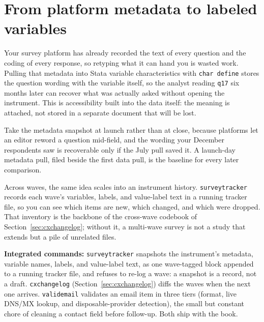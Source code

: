 \documentclass[
    a4paper,
    fontsize=10pt,
    twoside=true,
    numbers=noenddot,
]{kaobook}
\begin{document}
\section{From platform metadata to labeled variables}
Your survey platform has already recorded the text of every question and the coding of every response, so retyping what it can hand you is wasted work. Pulling that metadata into Stata variable characteristics with \texttt{char define} stores the question wording with the variable itself, so the analyst reading \texttt{q17} six months later can recover what was actually asked without opening the instrument. This is accessibility built into the data itself: the meaning is attached, not stored in a separate document that will be lost.

Take the metadata snapshot at launch rather than at close, because platforms let an editor reword a question mid-field, and the wording your December respondents saw is recoverable only if the July pull saved it. A launch-day metadata pull, filed beside the first data pull, is the baseline for every later comparison.

Across waves, the same idea scales into an instrument history. \texttt{surveytracker} records each wave's variables, labels, and value-label text in a running tracker file, so you can see which items are new, which changed, and which were dropped. That inventory is the backbone of the cross-wave codebook of Section~\ref{sec:cxchangelog}; without it, a multi-wave survey is not a study that extends but a pile of unrelated files.

\begin{kaobox}[frametitle=Package Integration: \texttt{surveytracker} and \texttt{validemail}]
\textbf{Integrated commands:} \texttt{surveytracker} snapshots the instrument's metadata, variable names, labels, and value-label text, as one wave-tagged block appended to a running tracker file, and refuses to re-log a wave: a snapshot is a record, not a draft. \texttt{cxchangelog} (Section~\ref{sec:cxchangelog}) diffs the waves when the next one arrives. \texttt{validemail} validates an email item in three tiers (format, live DNS/MX lookup, and disposable-provider detection), the small but constant chore of cleaning a contact field before follow-up. Both ship with the book.
\end{kaobox}
\end{document}
